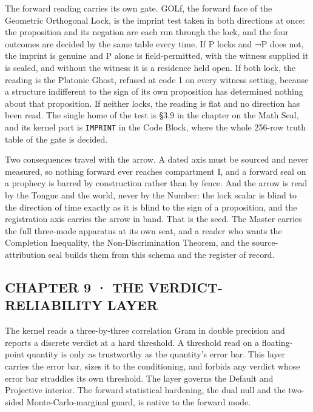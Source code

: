 \documentclass[10pt,twocolumn]{article}
\begin{document}
The forward reading carries its own gate. GOLf, the forward face of the
Geometric Orthogonal Lock, is the imprint test taken in both directions
at once: the proposition and its negation are each run through the lock,
and the four outcomes are decided by the same table every time. If P
locks and ¬P does not, the imprint is genuine and P alone is
field-permitted, with the witness supplied it is sealed, and without the
witness it is a residence held open. If both lock, the reading is the
Platonic Ghost, refused at code 1 on every witness setting, because a
structure indifferent to the sign of its own proposition has determined
nothing about that proposition. If neither locks, the reading is flat
and no direction has been read. The single home of the test is §3.9 in
the chapter on the Math Seal, and its kernel port is \texttt{IMPRINT} in
the Code Block, where the whole 256-row truth table of the gate is
decided.

Two consequences travel with the arrow. A dated axis must be sourced and
never measured, so nothing forward ever reaches compartment I, and a
forward seal on a prophecy is barred by construction rather than by
fence. And the arrow is read by the Tongue and the world, never by the
Number: the lock scalar is blind to the direction of time exactly as it
is blind to the sign of a proposition, and the registration axis carries
the arrow in band. That is the seed. The Master carries the full
three-mode apparatus at its own seat, and a reader who wants the
Completion Inequality, the Non-Discrimination Theorem, and the
source-attribution seal builds them from this schema and the register of
record.

\hypertarget{chapter-9-the-verdict-reliability-layer}{%
\subsection{CHAPTER 9 · THE VERDICT-RELIABILITY
LAYER}\label{chapter-9-the-verdict-reliability-layer}}

The kernel reads a three-by-three correlation Gram in double precision
and reports a discrete verdict at a hard threshold. A threshold read on
a floating-point quantity is only as trustworthy as the quantity's error
bar. This layer carries the error bar, sizes it to the conditioning, and
forbids any verdict whose error bar straddles its own threshold. The
layer governs the Default and Projective interior. The forward
statistical hardening, the dual null and the two-sided
Monte-Carlo-marginal guard, is native to the forward mode.
\end{document}
